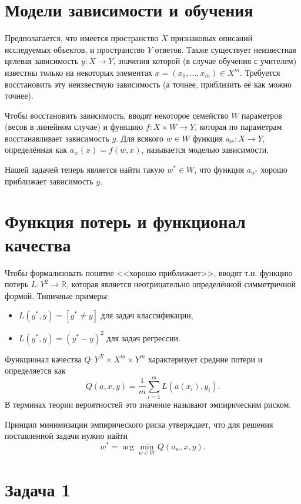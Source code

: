 \section{Модели зависимости и обучения}


Предполагается, что имеется пространство $X$ признаковых описаний исследуемых объектов, и пространство $Y$ ответов.
Также существует неизвестная целевая зависимость $y\colon X\to Y$, значения которой (в случае обучения с учителем) известны только на некоторых элементах $x = (x_1, \ldots, x_m) \in X^m$.
Требуется восстановить эту неизвестную зависимость (а точнее, приблизить её как можно точнее).

Чтобы восстановить зависимость, вводят некоторое семейство $W$ параметров (весов в линейном случае) и функцию \( f\colon X\times W\to Y\), которая по параметрам восстанавливает зависимость $y$. 
Для всякого \( w\in W\) функция \( a_w\colon X\to Y\), определённая как \( a_w(x) = f(w, x)\), называется моделью зависимости.

Нашей задачей теперь является найти такую $w^* \in W$, что функция \( a_{w^*}\) хорошо приближает зависимость $y$.

\section{Функция потерь и функционал качества}

Чтобы формализовать понятие <<хорошо приближает>>, вводят т.н. функцию потерь \( L\colon Y^2\to \mathbb{R} \), которая является неотрицательно определённой симметричной формой. Типичные примеры:
\begin{itemize}
    \item \(L(y^*, y) = [y^*\neq y]\) для задач классификации,

    \item \(L(y^*, y) = (y^* - y)^2\) для задач регрессии.
\end{itemize}

Функционал качества \( Q \colon Y^X \times X^m \times Y^m\) характеризует средние потери и определяется как
\[
    Q(a, x, y) = \frac{1}{m} \sum_{i=1}^m L(a(x_i), y_i).
\]
В терминах теории вероятностей это значение называют эмпирическим риском.

Принцип минимизации эмпирического риска утверждает, что для решения поставленной задачи нужно найти
\[
    w^* = \arg\min_{w\in W} Q(a_w, x, y).
\]

\section*{Задача 1}


